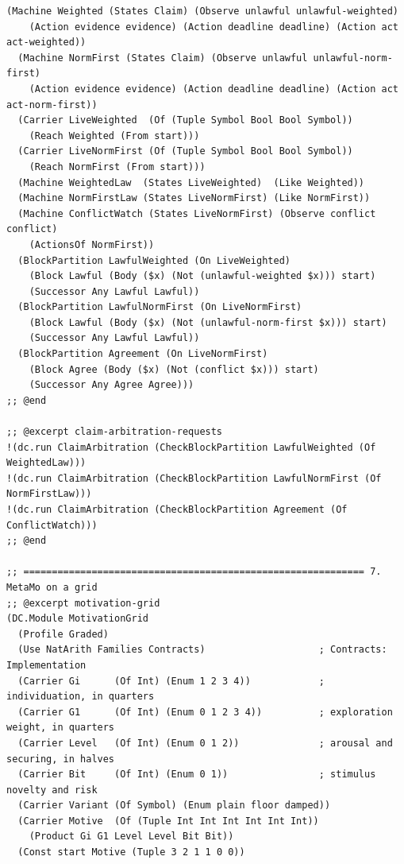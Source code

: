 \documentclass[11pt]{article}
\theoremstyle{definition}
\theoremstyle{plain}
\begin{document}
\begin{lstlisting}[style=mettafull]
  (Machine Weighted (States Claim) (Observe unlawful unlawful-weighted)
    (Action evidence evidence) (Action deadline deadline) (Action act act-weighted))
  (Machine NormFirst (States Claim) (Observe unlawful unlawful-norm-first)
    (Action evidence evidence) (Action deadline deadline) (Action act act-norm-first))
  (Carrier LiveWeighted  (Of (Tuple Symbol Bool Bool Symbol))
    (Reach Weighted (From start)))
  (Carrier LiveNormFirst (Of (Tuple Symbol Bool Bool Symbol))
    (Reach NormFirst (From start)))
  (Machine WeightedLaw  (States LiveWeighted)  (Like Weighted))
  (Machine NormFirstLaw (States LiveNormFirst) (Like NormFirst))
  (Machine ConflictWatch (States LiveNormFirst) (Observe conflict conflict)
    (ActionsOf NormFirst))
  (BlockPartition LawfulWeighted (On LiveWeighted)
    (Block Lawful (Body ($x) (Not (unlawful-weighted $x))) start)
    (Successor Any Lawful Lawful))
  (BlockPartition LawfulNormFirst (On LiveNormFirst)
    (Block Lawful (Body ($x) (Not (unlawful-norm-first $x))) start)
    (Successor Any Lawful Lawful))
  (BlockPartition Agreement (On LiveNormFirst)
    (Block Agree (Body ($x) (Not (conflict $x))) start)
    (Successor Any Agree Agree)))
;; @end

;; @excerpt claim-arbitration-requests
!(dc.run ClaimArbitration (CheckBlockPartition LawfulWeighted (Of WeightedLaw)))
!(dc.run ClaimArbitration (CheckBlockPartition LawfulNormFirst (Of NormFirstLaw)))
!(dc.run ClaimArbitration (CheckBlockPartition Agreement (Of ConflictWatch)))
;; @end

;; ============================================================ 7. MetaMo on a grid
;; @excerpt motivation-grid
(DC.Module MotivationGrid
  (Profile Graded)
  (Use NatArith Families Contracts)                    ; Contracts: Implementation
  (Carrier Gi      (Of Int) (Enum 1 2 3 4))            ; individuation, in quarters
  (Carrier G1      (Of Int) (Enum 0 1 2 3 4))          ; exploration weight, in quarters
  (Carrier Level   (Of Int) (Enum 0 1 2))              ; arousal and securing, in halves
  (Carrier Bit     (Of Int) (Enum 0 1))                ; stimulus novelty and risk
  (Carrier Variant (Of Symbol) (Enum plain floor damped))
  (Carrier Motive  (Of (Tuple Int Int Int Int Int Int))
    (Product Gi G1 Level Level Bit Bit))
  (Const start Motive (Tuple 3 2 1 1 0 0))


\end{lstlisting}
\end{document}
